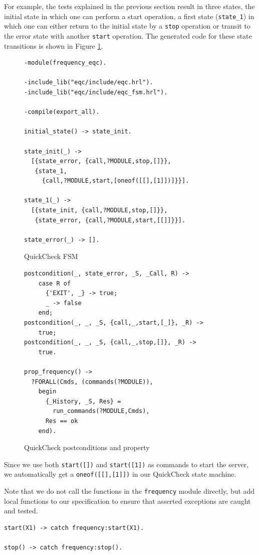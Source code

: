 \documentclass[]{sigplanconf}
\begin{document}
For example, the tests explained in the previous section result in three states, the initial state in which one can perform a start operation, a first state (\verb+state_1+) in which one can either return to the initial state by a \verb+stop+ operation or transit to the error state with another \verb+start+ operation. The generated code for these state transitions is shown in Figure \ref{qc-fsm}.

\begin{figure}
\begin{verbatim}
-module(frequency_eqc).

-include_lib("eqc/include/eqc.hrl").
-include_lib("eqc/include/eqc_fsm.hrl").

-compile(export_all).

initial_state() -> state_init.

state_init(_) ->
  [{state_error, {call,?MODULE,stop,[]}},
   {state_1,
     {call,?MODULE,start,[oneof([[],[1]])]}}].

state_1(_) ->
  [{state_init, {call,?MODULE,stop,[]}},
   {state_error, {call,?MODULE,start,[[]]}}].

state_error(_) -> [].
\end{verbatim}
\caption{QuickCheck FSM}
\label{qc-fsm}
\end{figure}

\begin{figure}
\begin{verbatim}
postcondition(_, state_error, _S, _Call, R) ->
    case R of
      {'EXIT', _} -> true;
      _ -> false
    end;
postcondition(_, _, _S, {call,_,start,[_]}, _R) ->
    true;
postcondition(_, _, _S, {call,_,stop,[]}, _R) ->
    true.

prop_frequency() ->
  ?FORALL(Cmds, (commands(?MODULE)),
    begin
      {_History, _S, Res} = 
        run_commands(?MODULE,Cmds), 
      Res == ok
    end).      
\end{verbatim}             
\caption{QuickCheck postconditions and property}
\label{qc-props}
\end{figure}


Since we use both \verb+start([])+ and \verb+start([1])+ as commands to start the server, we automatically get a \verb+oneof([[],[1]])+ in our QuickCheck state machine.

Note that we do not call the functions in the \verb+frequency+ module directly, but add local functions to our specification to ensure that asserted exceptions are caught and tested.
\begin{verbatim}
start(X1) -> catch frequency:start(X1).

stop() -> catch frequency:stop().
\end{verbatim}
\end{document}
